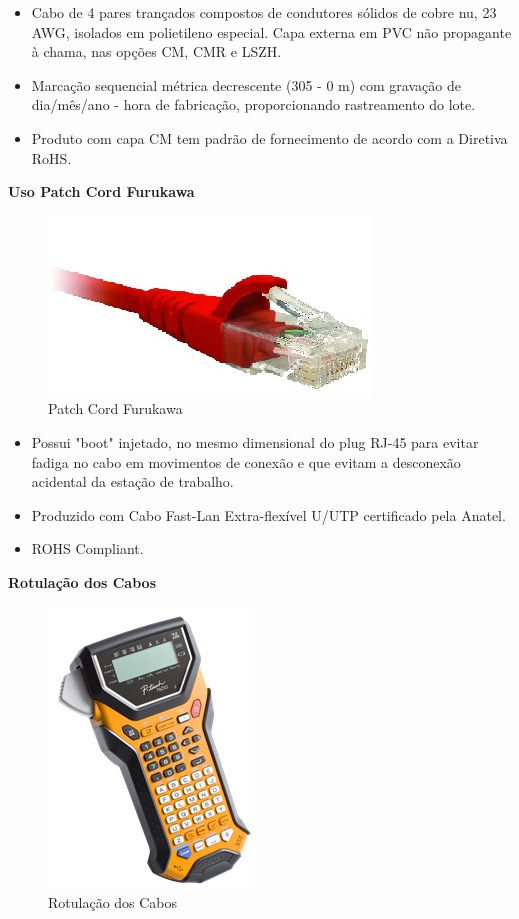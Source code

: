 \documentclass[	DIV=calc,%
							paper=a4,%
							fontsize=12pt,%
							onecolumn]{scrartcl}	 					%
\begin{document}
\begin{itemize}
	\item Cabo de 4 pares trançados compostos de condutores sólidos de cobre nu, 23 AWG, isolados em polietileno especial. Capa externa em PVC não propagante à chama, nas opções CM, CMR e LSZH.
	\item Marcação sequencial métrica decrescente (305 - 0 m) com gravação de dia/mês/ano - hora de fabricação, proporcionando rastreamento do lote.
	\item Produto com capa CM tem padrão de fornecimento de acordo com a Diretiva RoHS.
\end{itemize}

\textbf{Uso Patch Cord Furukawa}

\begin{figure}[!h]
	\centering
	\caption{Patch Cord Furukawa}
	\includegraphics{patch_cord_cat6_1}
\end{figure}

\begin{itemize}
	\item Possui "boot" injetado, no mesmo dimensional do plug RJ-45 para evitar fadiga no cabo em movimentos de conexão e que evitam a desconexão acidental da estação de trabalho. 
	\item Produzido com Cabo Fast-Lan Extra-flexível U/UTP certificado pela Anatel.
	\item ROHS Compliant.
\end{itemize}

\textbf{Rotulação dos Cabos}

\begin{figure}[!h]
	\centering
	\caption{Rotulação dos Cabos}
	\includegraphics{rotulador_1}
\end{figure}
\end{document}
